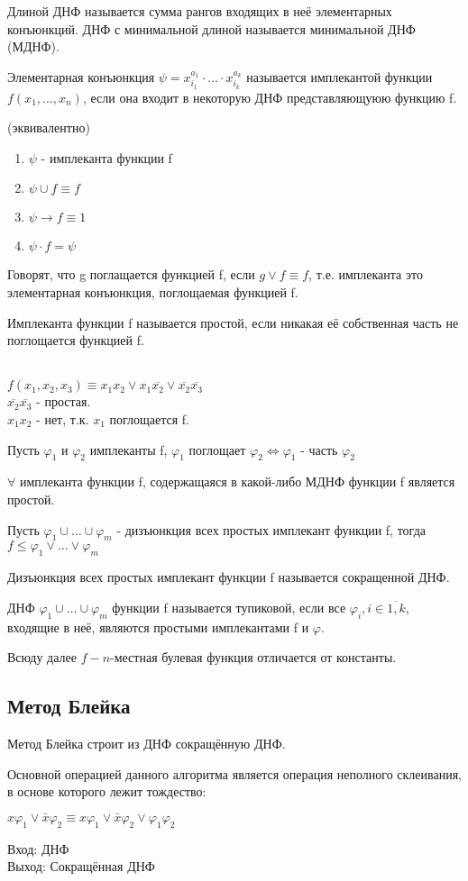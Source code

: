 \opr Длиной ДНФ называется сумма рангов входящих в неё элементарных конъюнкций. ДНФ с минимальной длиной называется минимальной ДНФ (МДНФ).

\opr Элементарная конъюнкция $\psi = x_{i_1}^{a_1}\cdot \dotsc \cdot x_{i_k}^{a_k}$ называется имплекантой функции $f(x_1,\dotsc,x_n)$, если она входит в некоторую ДНФ представляющуюю функцию f.

\utv (эквивалентно)
\begin{enumerate}
	\item $\psi$ - имплеканта функции f
	\item $\psi \cup f \equiv f$
	\item $\psi \rightarrow f \equiv 1$
	\item $\psi \cdot f = \psi$
\end{enumerate}

\opr Говорят, что g поглащается функцией f, если $g \vee f \equiv f$, т.е. имплеканта это элементарная конъюнкция, поглощаемая функцией f.

\opr Имплеканта функции f называется простой, если никакая её собственная часть не поглощается функцией f.

\example \\
$f(x_1, x_2, x_3) \equiv x_1x_2 \vee x_1\overline{x_2}\vee \overline{x_2} \overline{x_3}$\\
$\overline{x_2} \overline{x_3}$ - простая.\\
$x_1x_2$ - нет, т.к. $x_1$ поглощается f.

\lem Пусть $\varphi_1$ и $\varphi_2$ имплеканты f, $\varphi_1$ поглощает $\varphi_2 \Leftrightarrow \varphi_1$ - часть $\varphi_2$

\thr $\forall$ имплеканта функции f, содержащаяся в какой-либо МДНФ функции f является простой.

\thr Пусть $\varphi_1 \cup\dotsc\cup \varphi_m$ - дизъюнкция всех простых имплекант функции f, тогда $f \leq \varphi_1 \vee\dotsc\vee \varphi_m$

\opr Дизъюнкция всех простых имплекант функции f называется сокращенной ДНФ.

\opr ДНФ $\varphi_1 \cup\dotsc\cup \varphi_m$ функции f называется тупиковой, если все $\varphi_i, i \in \overline{1, k}$, входящие в неё, являются простыми имплекантами f и $\varphi$.

Всюду далее $f-n$-местная булевая функция отличается от константы.

\subsection {Метод Блейка}
Метод Блейка строит из ДНФ сокращённую ДНФ.\par
Основной операцией данного алгоритма является операция неполного склеивания, в основе которого лежит тождество:
\begin{center}
	$x\varphi_1 \vee \bar{x}\varphi_2 \equiv x\varphi_1 \vee \bar{x}\varphi_2 \vee \varphi_1\varphi_2$
\end{center}
Вход: ДНФ\\
Выход: Сокращённая ДНФ


